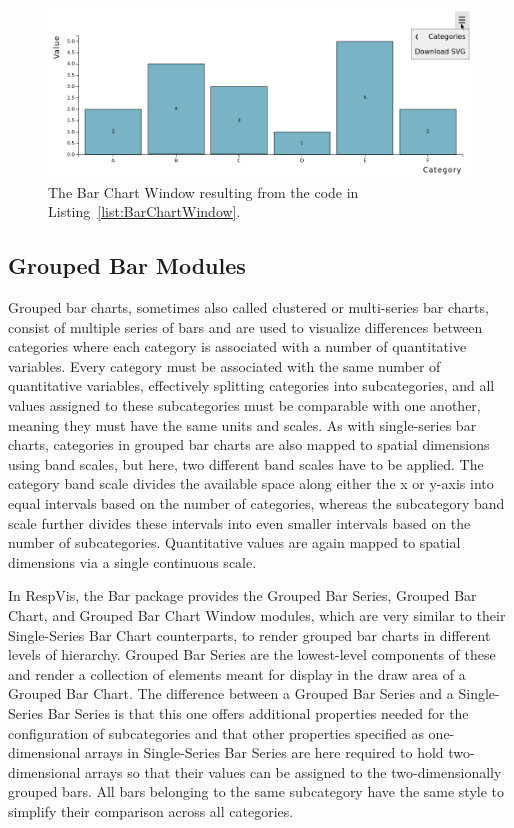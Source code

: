 \begin{figure}[tp]
\centering
\includegraphics[keepaspectratio,width=\linewidth,height=\halfh]
{images/bar-chart-window.png}
\caption[Bar Chart Window Example]{%
The Bar Chart Window resulting from the code in
Listing~\ref{list:BarChartWindow}.
}
\label{fig:BarChartWindow}
\end{figure}






\subsection{Grouped Bar Modules}

Grouped bar charts, sometimes also called clustered or multi-series
bar charts, consist of multiple series of bars and are used to
visualize differences between categories where each category is
associated with a number of quantitative variables. Every category
must be associated with the same number of quantitative variables,
effectively splitting categories into subcategories, and all values
assigned to these subcategories must be comparable with one another,
meaning they must have the same units and scales. As with
single-series bar charts, categories in grouped bar charts are also
mapped to spatial dimensions using band scales, but here, two
different band scales have to be applied. The category band scale
divides the available space along either the x or y-axis into
equal intervals based on the number of categories, whereas the
subcategory band scale further divides these intervals into even
smaller intervals based on the number of subcategories. Quantitative
values are again mapped to spatial dimensions via a single continuous
scale.

In RespVis, the Bar package provides the Grouped Bar Series,
Grouped Bar Chart, and Grouped Bar Chart Window modules, which are
very similar to their Single-Series Bar Chart counterparts, to render
grouped bar charts in different levels of hierarchy. Grouped Bar
Series are the lowest-level components of these and render a
collection of  elements meant for display in the draw
area of a Grouped Bar Chart. The difference between a Grouped Bar
Series and a Single-Series Bar Series is that this one offers
additional properties needed for the configuration of subcategories
and that other properties specified as one-dimensional arrays in
Single-Series Bar Series are here required to hold two-dimensional
arrays so that their values can be assigned to the two-dimensionally
grouped bars. All bars belonging to the same subcategory have the same
style to simplify their comparison across all categories. 

